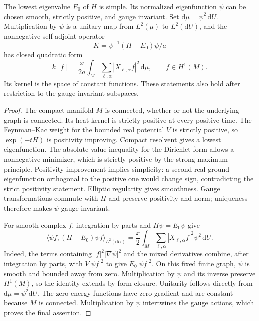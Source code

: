 \begin{lemma}
\label{vac:groundstate}
The lowest eigenvalue $E_0$ of $H$ is simple.  Its normalized eigenfunction
$\psi$ can be chosen smooth, strictly positive, and gauge invariant.  Set
$\mathrm d\mu=\psi^2\,\mathrm dU$.  Multiplication by $\psi$ is a unitary map
from $L^2(\mu)$ to $L^2(\mathrm dU)$, and the nonnegative self-adjoint operator
\begin{equation}
 K=\psi^{-1}(H-E_0)\psi/a
 \label{vac:K}
\end{equation}
has closed quadratic form
\begin{equation}
 k[f]=\frac{x}{2a}\int_M
          \sum_{\ell,\alpha}|X_{\ell,\alpha}f|^2\,\mathrm d\mu,
 \qquad f\in H^1(M).
 \label{vac:groundform}
\end{equation}
Its kernel is the space of constant functions.  These statements also hold
after restriction to the gauge-invariant subspaces.
\end{lemma}

\begin{proof}
The compact manifold $M$ is connected, whether or not the underlying graph
is connected.  Its heat kernel is strictly positive at every positive time.
The Feynman--Kac weight for the bounded real potential $V$ is strictly
positive, so $\exp(-tH)$ is positivity improving.  Compact resolvent gives a
lowest eigenfunction.  The absolute-value inequality for the Dirichlet form
allows a nonnegative minimizer, which is strictly positive by the strong
maximum principle.  Positivity improvement implies simplicity: a second
real ground eigenfunction orthogonal to the positive one would change sign,
contradicting the strict positivity statement.  Elliptic regularity gives
smoothness.  Gauge transformations commute with $H$ and preserve positivity
and norm; uniqueness therefore makes $\psi$ gauge invariant.

For smooth complex $f$, integration by parts and $H\psi=E_0\psi$ give
\begin{equation}
 \langle\psi f,(H-E_0)\psi f\rangle_{L^2(\mathrm dU)}
   =\frac{x}{2}\int_M
       \sum_{\ell,\alpha}|X_{\ell,\alpha}f|^2\psi^2\,\mathrm dU.
 \label{vac:transformidentity}
\end{equation}
Indeed, the terms containing $|f|^2|\nabla\psi|^2$ and the mixed derivatives
combine, after integration by parts, with $V|\psi f|^2$ to give
$E_0|\psi f|^2$.  On this fixed finite graph, $\psi$ is smooth and bounded
away from zero.  Multiplication by $\psi$ and its inverse preserve $H^1(M)$,
so the identity extends by form closure.  Unitarity follows directly from
$\mathrm d\mu=\psi^2\mathrm dU$.  The zero-energy functions have zero gradient
and are constant because $M$ is connected.  Multiplication by $\psi$
intertwines the gauge actions, which proves the final assertion.
\end{proof}

